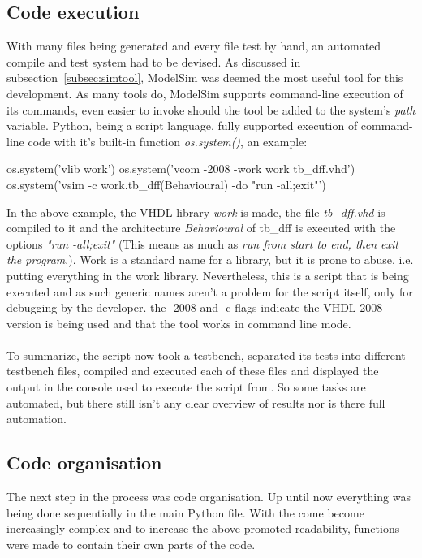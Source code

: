 \documentclass[11pt,british]{article}
\begin{document}
\subsection{Code execution}
With many files being generated and every file test by hand, an automated compile and test system had to be devised. As discussed in subsection~\ref{subsec:simtool}, ModelSim was deemed the most useful tool for this development. As many tools do, ModelSim supports command-line execution of its commands, even easier to invoke should the tool be added to the system's \emph{path} variable. Python, being a script language, fully supported execution of command-line code with it's built-in function \emph{os.system()}, an example:

\begin{python}
os.system('vlib work')
os.system('vcom -2008 -work work tb_dff.vhd')
os.system('vsim -c work.tb_dff(Behavioural) -do "run -all;exit"')
\end{python}

In the above example, the VHDL library \emph{work} is made, the file \emph{tb\_dff.vhd} is compiled to it and the architecture \emph{Behavioural} of tb\_dff is executed with the options \emph{"run -all;exit"} (This means as much as \emph{run from start to end, then exit the program}.). Work is a standard name for a library, but it is prone to abuse, i.e. putting everything in the work library. Nevertheless, this is a script that is being executed and as such generic names aren't a problem for the script itself, only for debugging by the developer. the -2008 and -c flags indicate the VHDL-2008 version is being used and that the tool works in command line mode.\\
\\
To summarize, the script now took a testbench, separated its tests into different testbench files, compiled and executed each of these files and displayed the output in the console used to execute the script from. So some tasks are automated, but there still isn't any clear overview of results nor is there full automation.


\subsection{Code organisation}
The next step in the process was code organisation. Up until now everything was being done sequentially in the main Python file. With the come become increasingly complex and to increase the above promoted readability, functions were made to contain their own parts of the code.
\end{document}
